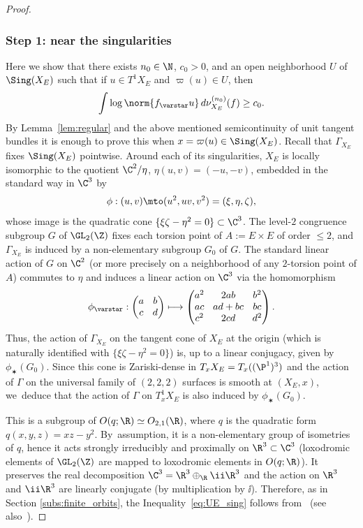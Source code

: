 \begin{proof}
\subsubsection*{Step 1: near the singularities}
Here we show that there exists $n_0\in \N$, $c_0>0$,
and an open neighborhood $U$ of $\Sing (X_E)$ such that if $u\in T^1X_E$ and
$\varpi(u)\in U$, then
\begin{equation}\label{eq:UE_sing}
\int \log\norm{f_\varstar u}\, d\nu_{X_E}^{(n_0)}(f) \geq c_0.
\end{equation}
By Lemma~\ref{lem:regular} and the above mentioned semicontinuity of unit tangent
bundles it is enough to prove this when
$x=\varpi(u)\in \Sing(X_E)$.
Recall that $\Gamma_{X_E}$ fixes $\Sing(X_E)$ pointwise. Around each of its singularities, $X_E$ is locally isomorphic to the quotient
$\C^2/\eta$, $\eta(u,v)=(-u,-v)$, embedded in the standard way in $\C^3$ by
\begin{equation*}
\phi: (u,v)\mto (u^2, uv, v^2) = (\xi,\eta,\zeta),
\end{equation*}
whose image is the quadratic cone $\{\xi\zeta-\eta^2 = 0\}\subset \C^3$. The level-$2$ congruence
subgroup $G$ of $\GL_2(\Z)$
fixes each torsion point of $A:=E\times E$ of order $\leq 2$, and $\Gamma_{X_E}$ is induced by
a non-elementary subgroup $G_0$ of $G$.
The standard linear action of $G$ on $\C^2$ (or more precisely on a neighborhood of any $2$-torsion point of $A$) commutes to $\eta$ and induces a linear action on $\C^3$ via the homomorphism
\begin{equation*}\arraycolsep4.5pt
\phi_\varstar: \begin{pmatrix} a&b\\ c&d\end{pmatrix} \longmapsto
\begin{pmatrix} a^2 & 2ab &b ^2 \\ ac & ad+bc & bc \\ c^2 & 2cd & d^2\end{pmatrix}.
\end{equation*}
Thus, the action of $\Gamma_{X_E}$ on the tangent cone
of $X_E$ at the origin (which is naturally identified with $\{\xi\zeta-\eta^2 = 0\}$)
is, up to a linear conjugacy, given by $\phi_\varstar(G_0)$. Since this cone is Zariski-dense in
$T_xX_E = T_x((\P^1)^3)$ and the action of $\Gamma$ on the universal family of $(2,2,2)$ surfaces is smooth at $(X_E, x)$, we~deduce that the action of $\Gamma$ on $T^1_xX_E$ is also induced
by $\phi_\varstar(G_0)$.

This is a subgroup
of $O(q;\R)\simeq O_{2,1}(\R)$, where $q$ is the quadratic form $q(x,y,z) = xz-y^2$. By~assumption, it is a non-elementary group of isometries of $q$, hence it acts strongly irreducibly and proximally on $\R^3\subset \C^3$ (loxodromic elements of $\GL_2(\Z)$ are mapped to loxodromic elements in $O(q;\R)$). It preserves the real decomposition $ \C^3=\R^3\oplus_\R \ii \R^3$ and the action on $\R^3$ and $\ii \R^3$ are linearly conjugate (by multiplication by $\ii$). Therefore, as in Section \ref{subs:finite_orbits}, the Inequality~\eqref{eq:UE_sing} follows from~\cite{furstenberg-kifer} (see also~\cite[Chap.\,III, Cor.\,3.4(iii)]{bougerol-lacroix}).


\end{proof}
